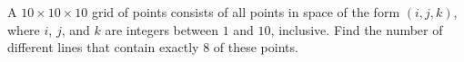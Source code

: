 A $10\times 10\times 10$ grid of points consists of all points in space of the form $(i,j,k)$, where $i$, $j$, and $k$ are integers between $1$ and $10$, inclusive. Find the number of different lines that contain exactly $8$ of these points.